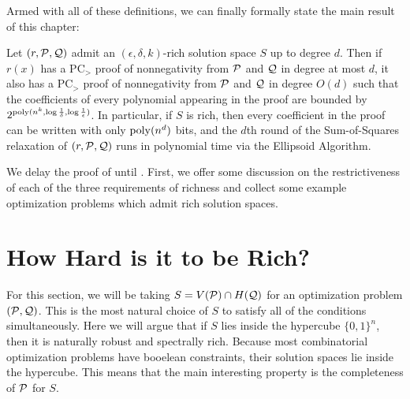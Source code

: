Armed with all of these definitions, we can finally formally state the main result of this chapter:
\begin{theorem}\label{thm:bit_complexity-main}
Let $(r, \mathcal P, \mathcal Q)$ admit an $(\epsilon,\delta,k)$-rich solution space $S$ up to degree $d$. Then if $r(x)$ has a PC$_>$ proof of nonnegativity from $\mathcal P$ and $\mathcal Q$ in degree at most $d$, it also has a PC$_>$ proof of nonnegativity from $\mathcal P$ and $\mathcal Q$ in degree $O(d)$ such that the coefficients of every polynomial appearing in the proof are bounded by $2^{\operatorname{poly}(n^k, \log \frac{1}{\delta}, \log \frac{1}{\epsilon})}$. In particular, if $S$ is rich, then every coefficient in the proof can be written with only $\operatorname{poly}(n^d)$ bits, and the $d$th round of the Sum-of-Squares relaxation of $(r, \mathcal P, \mathcal Q)$ runs in polynomial time via the Ellipsoid Algorithm.
\end{theorem}

We delay the proof of  until . First, we offer some discussion on the restrictiveness of each of the three requirements of richness and collect some example optimization problems which admit rich solution spaces.

\section{How Hard is it to be Rich?}
For this section, we will be taking $S = V(\mathcal P) \cap H(\mathcal Q)$ for an optimization problem $(\mathcal P,\mathcal Q)$. This is the most natural choice of $S$ to satisfy all of the conditions simultaneously. Here we will argue that if $S$ lies inside the hypercube $\{0,1\}^n$, then it is naturally robust and spectrally rich. Because most combinatorial optimization problems have booelean constraints, their solution spaces lie inside the hypercube. This means that the main interesting property is the completeness of $\mathcal P$ for $S$.
